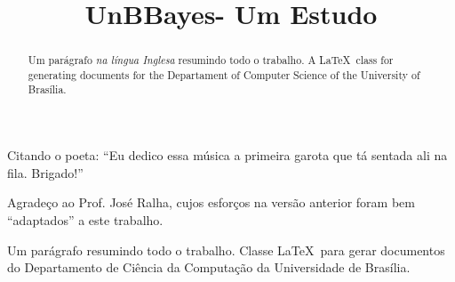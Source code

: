 \documentclass[mpca]{unb-cic}
\title{UnBBayes- Um Estudo}%
\begin{document}
  \maketitle

  \begin{dedicatoria}
Citando o poeta: ``Eu dedico essa música a primeira garota que tá sentada ali na fila. Brigado!''
  \end{dedicatoria}

  \begin{agradecimentos}
Agradeço ao Prof. José Ralha, cujos esforços na versão anterior foram bem ``adaptados'' a este trabalho.
  \end{agradecimentos}


  \begin{resumo}
  Um parágrafo resumindo todo o trabalho. Classe \LaTeX\ para gerar documentos do Departamento de Ciência da Computação da Universidade de Brasília.
  \end{resumo}
  

  \begin{abstract}
  Um parágrafo \emph{na língua Inglesa} resumindo todo o trabalho. A \LaTeX\ class for generating documents for the Departament of Computer Science of the University of Brasília.
  \end{abstract}

  \tableofcontents
  \listoffigures
  \listoftables
  \printnoidxglossaries
\renewcommand{\appendixname}{Anexo}


  \textual
  
  
  
  
  
  

  \postextual
  
  

\appendix
\end{document}
